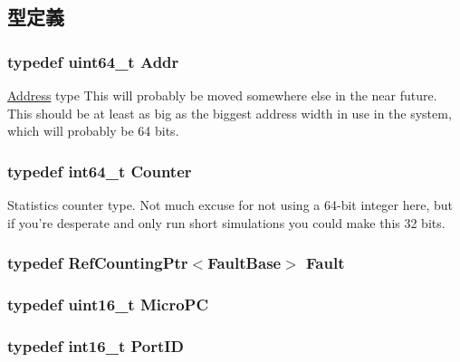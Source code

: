\subsection{型定義}
\hypertarget{base_2types_8hh_af1bb03d6a4ee096394a6749f0a169232}{
\subsubsection[{Addr}]{\setlength{\rightskip}{0pt plus 5cm}typedef uint64\_\-t {\bf Addr}}}
\label{base_2types_8hh_af1bb03d6a4ee096394a6749f0a169232}
\hyperlink{classAddress}{Address} type This will probably be moved somewhere else in the near future. This should be at least as big as the biggest address width in use in the system, which will probably be 64 bits. \hypertarget{base_2types_8hh_ae1475755791765b8e6f6a8bb091e273e}{
\subsubsection[{Counter}]{\setlength{\rightskip}{0pt plus 5cm}typedef int64\_\-t {\bf Counter}}}
\label{base_2types_8hh_ae1475755791765b8e6f6a8bb091e273e}
Statistics counter type. Not much excuse for not using a 64-\/bit integer here, but if you're desperate and only run short simulations you could make this 32 bits. \hypertarget{base_2types_8hh_a79b31ca450eaa665c335a928cb98b834}{
\subsubsection[{Fault}]{\setlength{\rightskip}{0pt plus 5cm}typedef {\bf RefCountingPtr}$<${\bf FaultBase}$>$ {\bf Fault}}}
\label{base_2types_8hh_a79b31ca450eaa665c335a928cb98b834}
\hypertarget{base_2types_8hh_adfb4d8b20c5abc8be73dd367b16f2d57}{
\subsubsection[{MicroPC}]{\setlength{\rightskip}{0pt plus 5cm}typedef uint16\_\-t {\bf MicroPC}}}
\label{base_2types_8hh_adfb4d8b20c5abc8be73dd367b16f2d57}
\hypertarget{base_2types_8hh_acef4d7d41cb21fdc252e20c04cd7bb8e}{
\subsubsection[{PortID}]{\setlength{\rightskip}{0pt plus 5cm}typedef int16\_\-t {\bf PortID}}}
